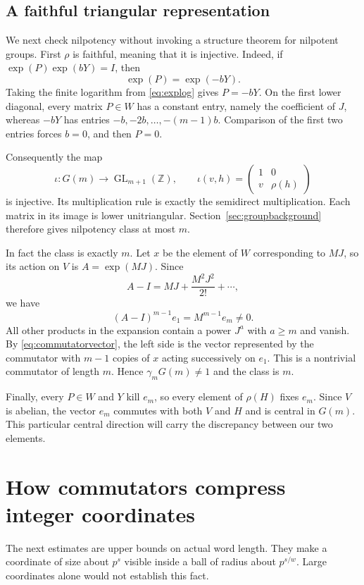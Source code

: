 \documentclass[11pt]{article}
\numberwithin{equation}{section}
\theoremstyle{definition}
\theoremstyle{remark}
\newcommand{\Z}{\mathbb Z}
\newcommand{\GL}{\operatorname{GL}}
\begin{document}
\subsection{A faithful triangular representation}
We next check nilpotency without invoking a structure theorem for nilpotent groups. First $\rho$ is faithful, meaning that it is injective. Indeed, if $\exp(P)\exp(bY)=I$, then
\[
\exp(P)=\exp(-bY).
\]
Taking the finite logarithm from \eqref{eq:explog} gives $P=-bY$. On the first lower diagonal, every matrix $P\in W$ has a constant entry, namely the coefficient of $J$, whereas $-bY$ has entries $-b,-2b,\ldots,-(m-1)b$. Comparison of the first two entries forces $b=0$, and then $P=0$.

Consequently the map
\begin{equation}\label{eq:affine}
\iota:G(m)\longrightarrow\GL_{m+1}(\Z),\qquad
\iota(v,h)=\begin{pmatrix}1&0\\v&\rho(h)\end{pmatrix}
\end{equation}
is injective. Its multiplication rule is exactly the semidirect multiplication. Each matrix in its image is lower unitriangular. Section~\ref{sec:groupbackground} therefore gives nilpotency class at most $m$.

In fact the class is exactly $m$. Let $x$ be the element of $W$ corresponding to $MJ$, so its action on $V$ is $A=\exp(MJ)$. Since
\[
A-I=MJ+\frac{M^2J^2}{2!}+\cdots,
\]
we have
\begin{equation}\label{eq:classwitness}
(A-I)^{m-1}e_1=M^{m-1}e_m\ne0.
\end{equation}
All other products in the expansion contain a power $J^a$ with $a\ge m$ and vanish. By \eqref{eq:commutatorvector}, the left side is the vector represented by the commutator with $m-1$ copies of $x$ acting successively on $e_1$. This is a nontrivial commutator of length $m$. Hence $\gamma_mG(m)\ne1$ and the class is $m$.

Finally, every $P\in W$ and $Y$ kill $e_m$, so every element of $\rho(H)$ fixes $e_m$. Since $V$ is abelian, the vector $e_m$ commutes with both $V$ and $H$ and is central in $G(m)$. This particular central direction will carry the discrepancy between our two elements.

\section{How commutators compress integer coordinates}\label{sec:compression}
The next estimates are upper bounds on actual word length. They make a coordinate of size about $p^s$ visible inside a ball of radius about $p^{s/w}$. Large coordinates alone would not establish this fact.
\end{document}
